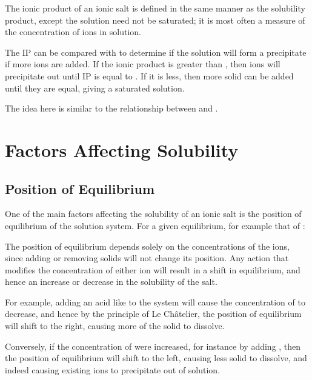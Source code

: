 			The ionic product of an ionic salt is defined in the same manner as the solubility product, except the solution need not be
			saturated; it is most often a measure of the  concentration of ions in solution.

			The IP can be compared with \Ksp{} to determine if the solution will form a precipitate if more ions are added. If the ionic
			product is greater than \Ksp{}, then ions will precipitate out until IP is equal to \Ksp{}. If it is less, then more solid
			can be added until they are equal, giving a saturated solution.

			The idea here is similar to the relationship between \Qc{} and \Kc{}.




	\pagebreak
	\section{Factors Affecting Solubility}

		\subsection{Position of Equilibrium}

			One of the main factors affecting the solubility of an ionic salt is the position of equilibrium of the solution system. For a
			given equilibrium, for example that of :


			The position of equilibrium depends solely on the concentrations of the ions, since adding or removing solids will not change its
			position. Any action that modifies the concentration of either ion will result in a shift in equilibrium, and hence an increase or
			decrease in the solubility of the salt.

			For example, adding an acid like  to the system will cause the concentration of  to decrease, and hence by the
			principle of Le Châtelier, the position of equilibrium will shift to the right, causing more of the solid to dissolve.

			Conversely, if the concentration of  were increased, for instance by adding , then the position of equilibrium
			will shift to the left, causing less solid to dissolve, and indeed causing existing ions to precipitate out of solution.

